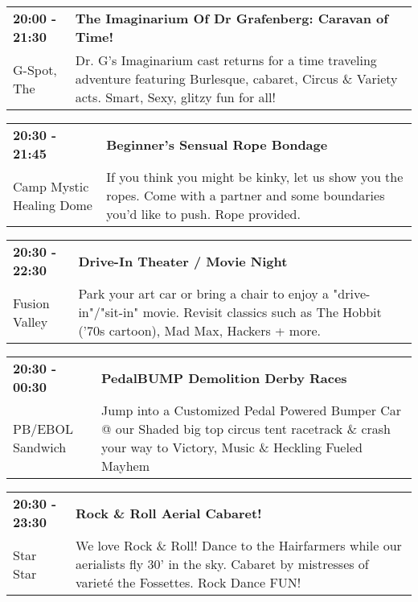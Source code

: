 \begin{tabular}{ p{1in} p{2.2in} }
    \textbf{20:00 - 21:30} & \textbf{The Imaginarium Of Dr Grafenberg: Caravan of Time!} \\
    G-Spot, The \newline  & Dr. G's Imaginarium cast returns for a time traveling adventure featuring Burlesque, cabaret, Circus \& Variety acts.  Smart, Sexy, glitzy fun for all! \\
    \hline 
\end{tabular}
    
\begin{tabular}{ p{1in} p{2.2in} }
    \textbf{20:30 - 21:45} & \textbf{Beginner's Sensual Rope Bondage} \\
    Camp Mystic \newline Healing Dome & If you think you might be kinky, let us show you the ropes.  Come with a partner and some boundaries you'd like to push.  Rope provided. \\
    \hline 
\end{tabular}
    
\begin{tabular}{ p{1in} p{2.2in} }
    \textbf{20:30 - 22:30} & \textbf{Drive-In Theater / Movie Night} \\
    Fusion Valley \newline  & Park your art car or bring a chair to enjoy a "drive-in"/"sit-in" movie. Revisit classics such as The Hobbit ('70s cartoon), Mad Max, Hackers + more. \\
    \hline 
\end{tabular}
    
\begin{tabular}{ p{1in} p{2.2in} }
    \textbf{20:30 - 00:30} & \textbf{PedalBUMP Demolition Derby Races} \\
    PB/EBOL Sandwich \newline  & Jump into a Customized Pedal Powered Bumper Car @ our Shaded big top circus tent racetrack \& crash your way to Victory, Music \& Heckling Fueled Mayhem \\
    \hline 
\end{tabular}
    
\begin{tabular}{ p{1in} p{2.2in} }
    \textbf{20:30 - 23:30} & \textbf{Rock \& Roll Aerial Cabaret!} \\
    Star Star \newline  & We love Rock \& Roll! Dance to the Hairfarmers while our aerialists fly 30' in the sky. Cabaret by mistresses of variet\'e the Fossettes. Rock Dance FUN! \\
    \hline 
\end{tabular}
    
